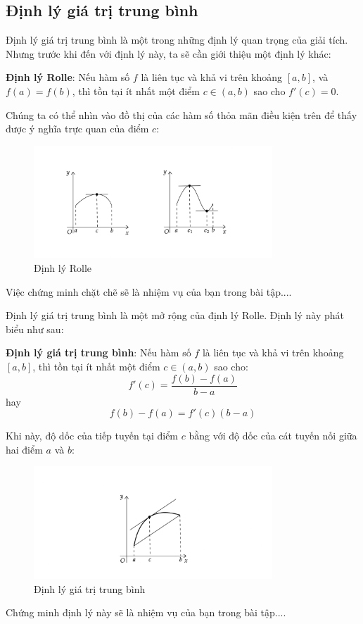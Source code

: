 \subsection{Định lý giá trị trung bình}
Định lý giá trị trung bình là một trong những định lý quan trọng của giải tích. Nhưng trước khi đến với định lý này, ta sẽ cần giới thiệu một định lý khác:
\begin{theorem}
\textbf{Định lý Rolle}: Nếu hàm số \(f\) là liên tục và khả vi trên khoảng \([a, b]\), và \(f(a) = f(b)\), thì tồn tại ít nhất một điểm \(c \in (a, b)\) sao cho \(f'(c) = 0\).
\end{theorem}
Chúng ta có thể nhìn vào đồ thị của các hàm số thỏa mãn điều kiện trên để thấy được ý nghĩa trực quan của điểm \(c\):
\begin{figure}[H]
\centering
\includegraphics[width=0.8\textwidth]{Tuan1/ảnh/ĐL Rolle.png}
\caption{Định lý Rolle}
\end{figure}
Việc chứng minh chặt chẽ sẽ là nhiệm vụ của bạn trong bài tập....

Định lý giá trị trung bình là một mở rộng của định lý Rolle. Định lý này phát biểu như sau:
\begin{theorem}
\textbf{Định lý giá trị trung bình}: Nếu hàm số \(f\) là liên tục và khả vi trên khoảng \([a, b]\), thì tồn tại ít nhất một điểm \(c \in (a, b)\) sao cho:
\begin{equation}
f'(c)=\frac{f(b) - f(a)}{b - a}
\end{equation}
hay
\begin{equation}
f(b) - f(a) = f'(c)(b - a)
\end{equation}
\end{theorem}
Khi này, độ dốc của tiếp tuyến tại điểm \(c\) bằng với độ dốc của cát tuyến nối giữa hai điểm \(a\) và \(b\):
\begin{figure}[H]
\centering
\includegraphics[width=0.8\textwidth]{Tuan1/ảnh/ĐL GTTB.png}
\caption{Định lý giá trị trung bình}
\end{figure}
Chứng minh định lý này sẽ là nhiệm vụ của bạn trong bài tập....
